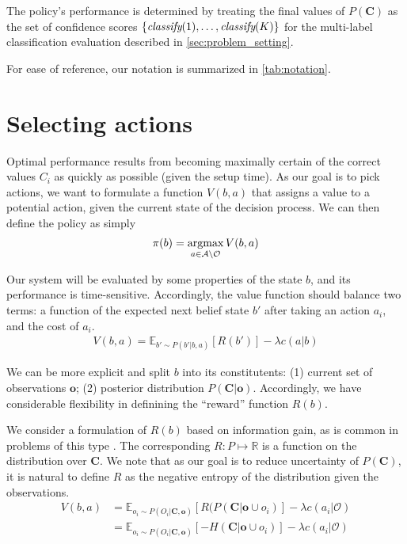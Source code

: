 \documentclass[runningheads]{llncs}
\begin{document}
The policy's performance is determined by treating the final values of $P(\mathbf{C})$ as the set of confidence scores $\{\emph{classify}(1), \dots, \emph{classify}(K)\}$ for the multi-label classification evaluation described in \autoref{sec:problem_setting}.

For ease of reference, our notation is summarized in \autoref{tab:notation}.

\section{Selecting actions} \label{sec:value}
Optimal performance results from becoming maximally certain of the correct values $C_i$ as quickly as possible (given the setup time).
As our goal is to pick actions, we want to formulate a function $V(b,a)$ 	that assigns a value to a potential action, given the current state of the decision process.
We can then define the policy as simply
\begin{align}
\pi(b) = \argmax_{a \in \mathcal{A} \setminus \mathcal{O}} V(b,a)
\end{align}

Our system will be evaluated by some properties of the state $b$, and its performance is time-sensitive.
Accordingly, the value function should balance two terms: a function of the expected next belief state $b'$ after taking an action $a_i$, and the cost of $a_i$.
\begin{align}
V(b,a) = \mathbb{E}_{b' \sim P(b'|b,a)}[R(b')] - \lambda c(a|b)
\end{align}

We can be more explicit and split $b$ into its constitutents: (1) current set of observations $\mathbf{o}$; (2) posterior distribution $P(\mathbf{C}|\mathbf{o})$.
Accordingly, we have considerable flexibility in definining the ``reward'' function $R(b)$.

We consider a formulation of $R(b)$ based on information gain, as is common in problems of this type .
The corresponding $R: P \mapsto \mathbb{R}$ is a function on the distribution over $\mathbf{C}$.
We note that as our goal is to reduce uncertainty of $P(\mathbf{C})$, it is natural to define $R$ as the negative entropy of the distribution given the observations.
\begin{align}
V(b,a)
&= \mathbb{E}_{o_i \sim P(O_i|\mathbf{C},\mathbf{o})}[R(P(\mathbf{C}|\mathbf{o} \cup o_i)] - \lambda c(a_i|\mathcal{O}) \\
&= \mathbb{E}_{o_i \sim P(O_i|\mathbf{C},\mathbf{o})}[-H(\mathbf{C}|\mathbf{o} \cup o_i)] - \lambda c(a_i|\mathcal{O})
\end{align}
\end{document}
